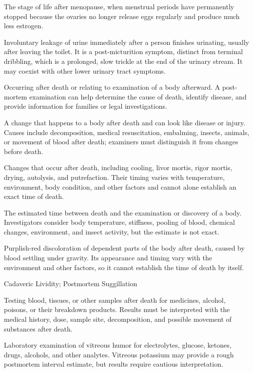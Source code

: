  The stage of life after menopause, when menstrual periods have permanently stopped because the ovaries no longer release eggs regularly and produce much less estrogen.

 Involuntary leakage of urine immediately after a
person finishes urinating, usually after leaving the toilet. It is a post-micturition
symptom, distinct from terminal dribbling, which is a prolonged, slow trickle at the end
of the urinary stream. It may coexist with other lower urinary tract symptoms.

 Occurring after death or relating to examination of a body afterward. A post-mortem examination can help determine the cause of death, identify disease, and provide information for families or legal investigations.

 A change that happens to a body after death and can look like disease or injury. Causes include decomposition, medical resuscitation, embalming, insects, animals, or movement of blood after death; examiners must distinguish it from changes before death.

 Changes that occur after death, including cooling, livor mortis, rigor mortis, drying, autolysis, and putrefaction. Their timing varies with temperature, environment, body condition, and other factors and cannot alone establish an exact time of death.

 The estimated time between death and the examination or discovery of a body. Investigators consider body temperature, stiffness, pooling of blood, chemical changes, environment, and insect activity, but the estimate is not exact.

 Purplish-red discoloration of dependent parts of the body after death, caused by blood settling under gravity. Its appearance and timing vary with the environment and other factors, so it cannot establish the time of death by itself.

\synonyms
Cadaveric Lividity; Postmortem Suggillation

 Testing blood, tissues, or other samples after death for medicines, alcohol, poisons, or their breakdown products. Results must be interpreted with the medical history, dose, sample site, decomposition, and possible movement of substances after death.

 Laboratory examination of vitreous humor for electrolytes, glucose, ketones, drugs, alcohols, and other analytes. Vitreous potassium may provide a rough postmortem interval estimate, but results require cautious interpretation.

